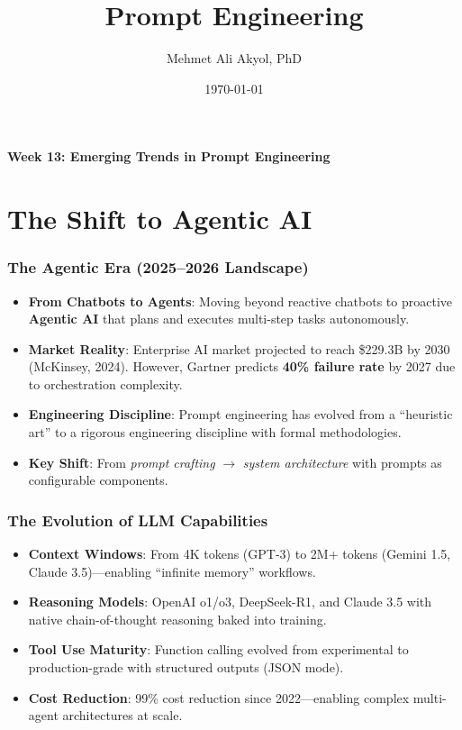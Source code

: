 \documentclass{beamer}
\title{Prompt Engineering}
\author{Mehmet Ali Akyol, PhD}
\institute{Ankara Medipol University}
\date{\today}
\begin{document}
\begin{frame}
    \titlepage
    \begin{center}
        \vspace{1cm}
        \textbf{Week 13: Emerging Trends in Prompt Engineering}
    \end{center}
\end{frame}

\section{The Shift to Agentic AI}

\begin{frame}
    \frametitle{The Agentic Era (2025--2026 Landscape)}
    \begin{itemize}
        \item \textbf{From Chatbots to Agents}: Moving beyond reactive chatbots to proactive \textbf{Agentic AI} that plans and executes multi-step tasks autonomously.
        \item \textbf{Market Reality}: Enterprise AI market projected to reach \$229.3B by 2030 (McKinsey, 2024). However, Gartner predicts \textbf{40\% failure rate} by 2027 due to orchestration complexity.
        \item \textbf{Engineering Discipline}: Prompt engineering has evolved from a ``heuristic art'' to a rigorous engineering discipline with formal methodologies.
        \item \textbf{Key Shift}: From \textit{prompt crafting} $\rightarrow$ \textit{system architecture} with prompts as configurable components.
    \end{itemize}
\end{frame}

\begin{frame}
    \frametitle{The Evolution of LLM Capabilities}
    \begin{itemize}
        \item \textbf{Context Windows}: From 4K tokens (GPT-3) to 2M+ tokens (Gemini 1.5, Claude 3.5)---enabling ``infinite memory'' workflows.
        \item \textbf{Reasoning Models}: OpenAI o1/o3, DeepSeek-R1, and Claude 3.5 with native chain-of-thought reasoning baked into training.
        \item \textbf{Tool Use Maturity}: Function calling evolved from experimental to production-grade with structured outputs (JSON mode).
        \item \textbf{Cost Reduction}: 99\% cost reduction since 2022---enabling complex multi-agent architectures at scale.
    \end{itemize}
\end{frame}
\end{document}
